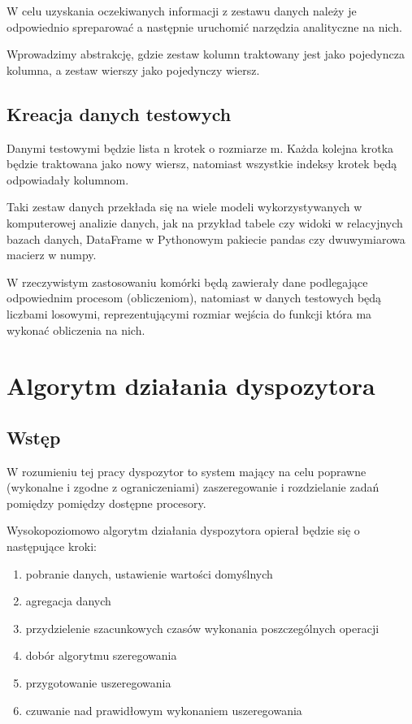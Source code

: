 \documentclass[brudnopis]{xmgr}
\begin{document}
W celu uzyskania oczekiwanych informacji z zestawu danych należy je odpowiednio spreparować a następnie uruchomić narzędzia analityczne na nich.

Wprowadzimy abstrakcję, gdzie zestaw kolumn traktowany jest jako pojedyncza kolumna, a zestaw wierszy jako pojedynczy wiersz.


\section{Kreacja danych testowych}

Danymi testowymi będzie lista n krotek o rozmiarze m.
Każda kolejna krotka będzie traktowana jako nowy wiersz, natomiast wszystkie indeksy krotek będą odpowiadały kolumnom. 


Taki zestaw danych przekłada się na wiele modeli wykorzystywanych w komputerowej analizie danych, jak na przykład tabele czy widoki w relacyjnych bazach danych, DataFrame w Pythonowym pakiecie pandas czy dwuwymiarowa macierz w numpy.

W rzeczywistym zastosowaniu komórki będą zawierały dane podlegające odpowiednim procesom (obliczeniom), natomiast w danych testowych będą liczbami losowymi, reprezentującymi rozmiar wejścia do funkcji która ma wykonać obliczenia na nich.

\chapter{Algorytm działania dyspozytora}

\section{Wstęp}

W rozumieniu tej pracy dyspozytor to system mający na celu poprawne (wykonalne i zgodne z ograniczeniami) zaszeregowanie i rozdzielanie zadań pomiędzy pomiędzy dostępne procesory.

Wysokopoziomowo algorytm działania dyspozytora opierał będzie się o następujące kroki:

\begin{enumerate}
    \item pobranie danych, ustawienie wartości domyślnych
    \item agregacja danych
    \item przydzielenie szacunkowych czasów wykonania poszczególnych operacji
    \item dobór algorytmu szeregowania 
    \item przygotowanie uszeregowania
    \item czuwanie nad prawidłowym wykonaniem uszeregowania
\end{enumerate}
\end{document}
